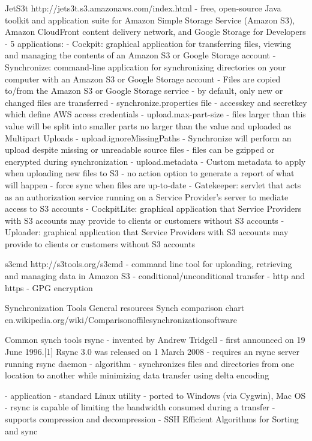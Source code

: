 			JetS3t
				http://jets3t.s3.amazonaws.com/index.html
				- free, open-source Java toolkit and application suite for Amazon Simple Storage Service (Amazon S3), Amazon CloudFront content delivery network, and Google Storage for Developers
				- 5 applications:
					- Cockpit: graphical application for transferring files, viewing and managing the contents of an Amazon S3 or Google Storage account
					- Synchronize: command-line application for synchronizing directories on your computer with an Amazon S3 or Google Storage account
						- Files are copied to/from the Amazon S3 or Google Storage service
						- by default, only new or changed files are transferred
						- synchronize.properties file
							- accesskey and secretkey which define AWS access credentials
							- upload.max-part-size
								- files larger than this value will be split into smaller parts no larger than the value and uploaded as Multipart Uploads
							- upload.ignoreMissingPaths
								- Synchronize will perform an upload despite missing or unreadable source files
							- files can be gzipped or encrypted during synchronization
							- upload.metadata
								-  Custom metadata to apply when uploading new files to S3
						- no action option to generate a report of what will happen
						- force sync when files are up-to-date
					- Gatekeeper: servlet that acts as an authorization service running on a Service Provider's server to mediate access to S3 accounts
					- CockpitLite: graphical application that Service Providers with S3 accounts may provide to clients or customers without S3 accounts
					- Uploader: graphical application that Service Providers with S3 accounts may provide to clients or customers without S3 accounts
					
		s3cmd
			http://s3tools.org/s3cmd
				- command line tool for uploading, retrieving and managing data in Amazon S3
				- conditional/unconditional transfer
				- http and https
				- GPG encryption
				
	Synchronization Tools
		General resources
			Synch comparison chart 
				en.wikipedia.org/wiki/Comparisonoffilesynchronizationsoftware
		
		Common synch tools
			rsync
				- invented by Andrew Tridgell
				- first announced on 19 June 1996.[1] Rsync 3.0 was released on 1 March 2008
				- requires an rsync server running rsync daemon
				- algorithm
					- synchronizes files and directories from one location to another while minimizing data transfer using delta encoding
					
				- application
					- standard Linux utility
					- ported to Windows (via Cygwin), Mac OS
					- rsync is capable of limiting the bandwidth consumed during a transfer
					- supports compression and decompression
					- SSH
				Efficient Algorithms for Sorting and sync
				
